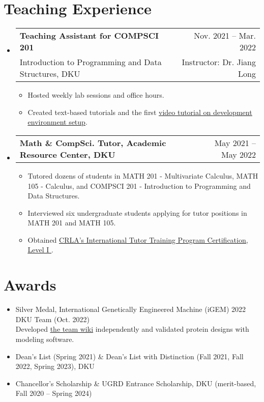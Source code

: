 \documentclass[letterpaper,11pt]{article}
\makeatletter
\newcommand{\CVItem}[1]{
  \item{\small
    {#1 \vspace{-2pt}}
  }
}
\newcommand{\CVSubheadingFrame}[1]{
  \vspace{-2pt}\item
    \begin{tabular*}{0.97\textwidth}[t]{l@{\extracolsep{\fill}}r}
        #1
    \end{tabular*}\vspace{-7pt}
}
\newcommand{\CVSubheading}[4]{\CVSubheadingFrame
    {\textbf{#1} & #2 \\
        \small#3 & #4 \\
    }}
\newcommand{\CVSubHeadingListStart}{\begin{itemize}[leftmargin=0.5cm, label={}]}
\newcommand{\CVSubHeadingListEnd}{\end{itemize}}
\newcommand{\CVItemListStart}{\begin{itemize}}
\newcommand{\CVItemListEnd}{\end{itemize}\vspace{-5pt}}
\newcommand{\uhref}[2]{\href{#1}{\underline{#2}}}
\makeatother
\begin{document}
\begin{refsection}
    \nocite{he2024fedkit}
    \printbibliography[title=Conference Publication]
\end{refsection}

\begin{refsection}
    \nocite{luo2024fedcampus}
    \printbibliography[title=Presentation]
\end{refsection}

\section{Teaching Experience}
\CVSubHeadingListStart
\CVSubheading
{Teaching Assistant for COMPSCI 201}{Nov. 2021 -- Mar. 2022}
{Introduction to Programming and Data Structures, DKU}
{Instructor: Dr. Jiang Long}
\CVItemListStart
\CVItem
{Hosted weekly lab sessions and office hours.}
\CVItem
{Created text-based tutorials and the first
    \uhref{https://www.youtube.com/watch?v=yiL-ULPBkvE}
    {video tutorial on development environment setup}.
}
\CVItemListEnd

\CVSubheadingFrame
{\textbf{Math \& CompSci. Tutor, Academic Resource Center, DKU}&
    May 2021 -- May 2022
}
\CVItemListStart
\CVItem
{Tutored dozens of students in MATH 201 - Multivariate Calculus,
    MATH 105 - Calculus,
    and COMPSCI 201 - Introduction to Programming and Data Structures.
}
\CVItem
{Interviewed six undergraduate students applying for tutor positions in MATH 201
    and MATH 105.
}
\CVItem
{Obtained \uhref
    {https://github.com/SichangHe/curriculum_vitae/files/11665403/CRLA_certificate.pdf}
    {CRLA's International Tutor Training Program Certification,
        Level I
    }.}
\CVItemListEnd
\CVSubHeadingListEnd

\section{Awards}
\begin{itemize}
    \item Silver Medal, International Genetically Engineered Machine (iGEM)
          2022 DKU Team (Oct. 2022)\\{\small
          Developed \uhref{https://github.com/SichangHe/igem-2022-dku-backup}
          {the team wiki} independently and
          validated protein designs with modeling software.
          }
          \vspace{-4pt}
    \item Dean's List (Spring 2021) \&
          Dean's List with Distinction (Fall 2021, Fall 2022, Spring 2023),
          DKU
          \vspace{-4pt}
    \item Chancellor's Scholarship \& UGRD Entrance Scholarship, DKU
          (merit-based, Fall 2020 -- Spring 2024)
          \vspace{-4pt}
\end{itemize}
\end{document}
